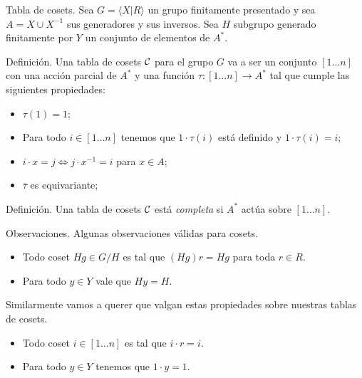 \documentclass[aspectratio=169, 9pt]{beamer}
\newcommand{\fp}{finitamente presentado }
\newcommand{\In}{[1 \dots n]}
\newcommand{\ol}{\overline}
\newcommand{\Co}{{\cal{C}}}
\begin{document}
\begin{frame}[fragile]{Tabla de cosets.}
Sea $G = \langle X | R \rangle$ un grupo \fp y sea $A = X \cup X^{-1}$ sus generadores y sus inversos.
Sea $H$ subgrupo generado finitamente por $Y$ un conjunto de elementos de $A^*$.

\begin{alertblock}{Definición.}
	Una tabla de cosets $\Co $ para el grupo $G$ va a ser un conjunto $\In$ con una acción parcial de $A^{*}$ y una función $\tau: \In \to A^*$ tal que cumple las siguientes propiedades:
	\begin{itemize}
		\item $\tau(1)  = 1$;
		\item Para todo $i \in \In$ tenemos que $1\cdot {\tau(i)}$ está definido y $1\cdot {\tau(i)} = i$;
		\item $i \cdot x = j \iff j \cdot x^{-1} = i$ para $x \in A$;
		\item $\ol \tau$ es equivariante;
	\end{itemize}	
\end{alertblock}

%	


\begin{alertblock}{Definición.}
	Una tabla de cosets $\Co$ está \emph{completa} si $A^*$ actúa sobre $\In$.
\end{alertblock}

\end{frame}

\begin{frame}[fragile]{Observaciones.}
	Algunas observaciones válidas para cosets.
	\begin{itemize}		
		\item Todo coset $Hg \in G/H$ es tal que $(Hg)r = Hg$ para toda $r \in R$.
		
		\item Para todo $y \in Y$ vale que $Hy = H$.
	\end{itemize}	

	Similarmente vamos a querer que valgan estas propiedades sobre nuestras tablas de cosets.
	\begin{itemize}
		\item Todo coset $i \in \In$ es tal que $i \cdot r = i$.
		
		\item Para todo $y \in Y$ tenemos que $1 \cdot y = 1$.
	\end{itemize}
\end{frame}
\end{document}
